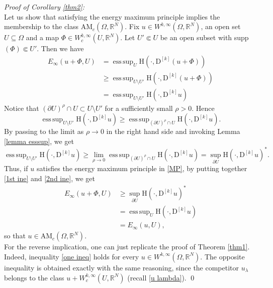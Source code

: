 \documentclass[a4paper,11pt]{article}
\numberwithin{equation}{section}
\newcommand{\numberset}{\mathbb}
\newcommand{\Om}{\Omega}
\newcommand{\R}{\numberset{R}}
\newcommand{\rom}{\mathrm}
\DeclareMathOperator*{\esssup}{ess\,sup}
\theoremstyle{definition}
\begin{document}
\textit{Proof of Corollary \ref{thm2}:}\\
Let us show that satisfying the energy maximum principle implies the membership to the class $ \mathrm {AM}_c(\Om,\R^N)$. Fix $u\in W^{k,\infty}(\Om,\R^N)$, an open set $U\subseteq\Om$ and a map $\Phi\in W^{k,\infty}_c(U,\R^N)$. Let $U'\Subset U$ be an open subset with supp$(\Phi)\Subset U'$. Then we have
\begin{equation}\label{1st ine}
\begin{aligned}
E_\infty(u+\Phi,U)&=\esssup_U \rom{H}(\cdot, \mathrm D^{[k]}(u+\Phi))\\
&\geq \esssup_{U\setminus U'}\rom{H}(\cdot, \mathrm D^{[k]}(u+\Phi))\\
&=\esssup_{U\setminus U'}\rom{H}(\cdot, \mathrm D^{[k]}u)
\end{aligned}
\end{equation}
Notice that $(\partial U)^\rho\cap U\subset U\setminus U'$ for a sufficiently small $\rho>0$. Hence
$$
\esssup_{U\setminus U'}\rom{H}(\cdot, \mathrm D^{[k]}u)\geq \esssup_{(\partial U)^\rho\cap U}\rom{H}(\cdot, \mathrm D^{[k]}u).
$$
By passing to the limit as $\rho\to 0$ in the right hand side and invoking Lemma \ref{lemma esssup}, we get
\begin{equation}\label{2nd ine}
\esssup_{U\setminus U'}\rom{H}(\cdot, \mathrm D^{[k]}u)\geq \lim_{\rho\to0}\esssup_{(\partial U)^\rho\cap U}\rom{H}(\cdot, \mathrm D^{[k]}u)=\sup_{\partial U}\rom{H}(\cdot, \mathrm D^{[k]}u)^*.
\end{equation}
Thus, if $u$ satisfies the energy maximum principle in \eqref{MP}, by putting together \eqref{1st ine} and \eqref{2nd ine}, we get
\begin{align*}
E_\infty(u+\Phi,U)&\geq\sup_{\partial U}\rom{H}(\cdot, \mathrm D^{[k]}u)^*\\
&=\esssup_{U}\rom{H}(\cdot, \mathrm D^{[k]}u)\\
&=E_\infty(u,U),
\end{align*}
so that $u\in \mathrm{AM}_c(\Om,\R^N)$.\\
For the reverse implication, one can just replicate the proof of Theorem \ref{thm1}. Indeed, inequality \eqref{one ineq} holds for every $u\in W^{k,\infty}(\Om,\R^N)$. The opposite inequality is obtained exactly with the same reasoning, since the competitor $u_\lambda$ belongs to the class $u+W^{k,\infty}_c(U,\R^N)$ (recall \eqref{u lambda}).
\qed\\
\end{document}
